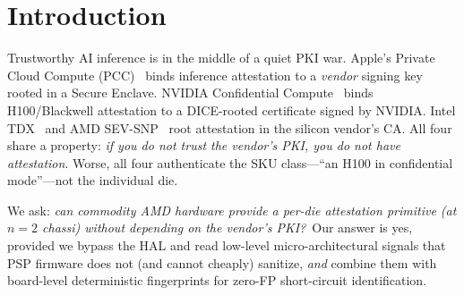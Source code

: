 \documentclass[11pt,letterpaper]{article}
\begin{document}
\section{Introduction}

Trustworthy AI inference is in the middle of a quiet PKI war.
Apple's Private Cloud Compute (PCC)~\cite{PCC2024} binds inference
attestation to a \emph{vendor} signing key rooted in a Secure Enclave.
NVIDIA Confidential Compute~\cite{NVIDIACC} binds H100/Blackwell
attestation to a DICE-rooted certificate signed by NVIDIA. Intel
TDX~\cite{TDX2024} and AMD SEV-SNP~\cite{SEVSNP} root attestation in
the silicon vendor's CA. All four share a property: \emph{if you do not
trust the vendor's PKI, you do not have attestation}. Worse, all four
authenticate the SKU class---``an H100 in confidential mode''---not the
individual die.

We ask: \emph{can commodity AMD hardware provide a per-die attestation
primitive (at $n=2$ chassi) without depending on the vendor's PKI?}\ Our
answer is yes, provided we bypass the HAL and read low-level
micro-architectural signals that PSP firmware does not (and cannot
cheaply) sanitize, \emph{and} combine them with board-level
deterministic fingerprints for zero-FP short-circuit identification.
\end{document}
